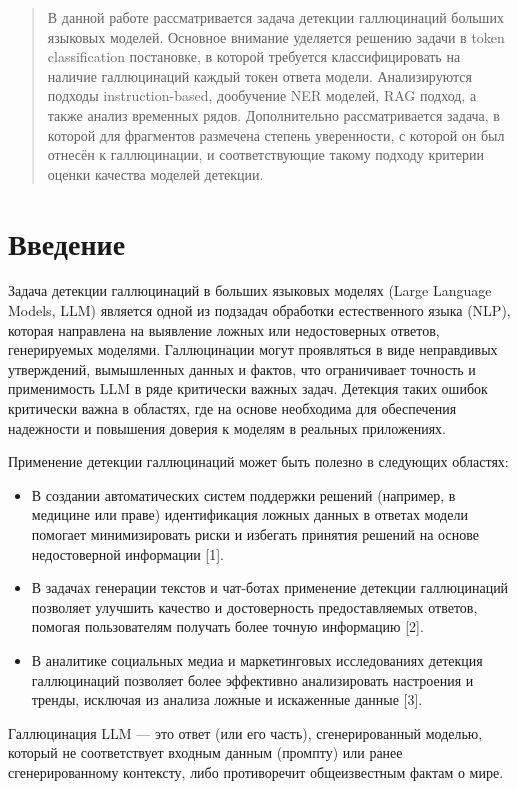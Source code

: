 \documentclass[12pt]{article}
\begin{document}
\clearpage
\tableofcontents
\clearpage

\begin{abstract}
В данной работе рассматривается задача детекции галлюцинаций больших языковых моделей. Основное внимание уделяется решению задачи в token classification постановке, в которой требуется классифицировать на наличие галлюцинаций каждый токен ответа модели. Анализируются подходы instruction-based, дообучение NER моделей, RAG подход, а также анализ временных рядов. Дополнительно рассматривается задача, в которой для фрагментов размечена степень уверенности, с которой он был отнесён к галлюцинации, и соответствующие такому подходу критерии оценки качества моделей детекции.

%
\end{abstract}


\section{Введение}
Задача детекции галлюцинаций в больших языковых моделях (Large Language Models, LLM) является одной из подзадач обработки естественного языка (NLP), которая направлена на выявление ложных или недостоверных ответов, генерируемых моделями. Галлюцинации могут проявляться в виде неправдивых утверждений, вымышленных данных и фактов, что ограничивает точность и применимость LLM в ряде критически важных задач. Детекция таких ошибок критически важна в областях, где на основе необходима для обеспечения надежности и повышения доверия к моделям в реальных приложениях.

Применение детекции галлюцинаций может быть полезно в следующих областях:
\begin{itemize}
    \item В создании автоматических систем поддержки решений (например, в медицине или праве) идентификация ложных данных в ответах модели помогает минимизировать риски и избегать принятия решений на основе недостоверной информации [1].
    \item В задачах генерации текстов и чат-ботах применение детекции галлюцинаций позволяет улучшить качество и достоверность предоставляемых ответов, помогая пользователям получать более точную информацию [2].
    \item В аналитике социальных медиа и маркетинговых исследованиях детекция галлюцинаций позволяет более эффективно анализировать настроения и тренды, исключая из анализа ложные и искаженные данные [3].
\end{itemize}
Галлюцинация LLM — это ответ (или его часть), сгенерированный моделью, который не соответствует входным данным (промпту) или ранее сгенерированному контексту, либо противоречит общеизвестным фактам о мире. 
\end{document}
